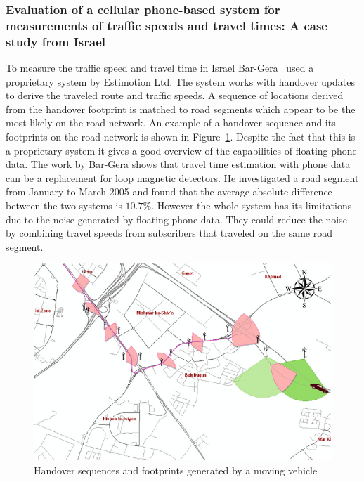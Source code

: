 \subsubsection{Evaluation of a cellular phone-based system for measurements of traffic speeds and travel times: A case study from Israel}
To measure the traffic speed and travel time in Israel Bar-Gera~\cite{Bar2007} used a proprietary system by Estimotion Ltd. The system works with handover updates to derive the traveled route and traffic speeds. A sequence of locations derived from the handover footprint is matched to road segments which appear to be the most likely on the road network. An example of a handover sequence and its footprints on the road network is shown in Figure~\ref{fig:bar}. Despite the fact that this is a proprietary system it gives a good overview of the capabilities of floating phone data. The work by Bar-Gera shows that travel time estimation with phone data can be a replacement for loop magnetic detectors. He investigated a road segment from January to March 2005 and found that the average absolute difference between the two systems is $10.7\%$. However the whole system has its limitations due to the noise generated by floating phone data. They could reduce the noise by combining travel speeds from subscribers that traveled on the same road segment.
\begin{figure}
\centering
\includegraphics[width=\linewidth]{images/bar}
\caption{Handover sequences and footprints generated by a moving vehicle~\cite{Bar2007}}
\label{fig:bar}
\end{figure}

